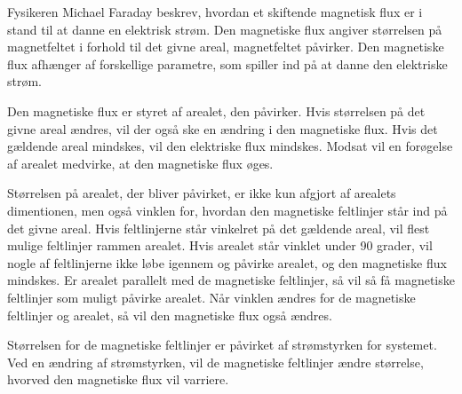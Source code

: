 Fysikeren Michael Faraday beskrev, hvordan et skiftende magnetisk flux er i stand til at danne en elektrisk strøm. Den magnetiske flux angiver størrelsen på magnetfeltet i forhold til det givne areal, magnetfeltet påvirker. Den magnetiske flux afhænger af forskellige parametre, som spiller ind på at danne den elektriske strøm.

Den magnetiske flux er styret af arealet, den påvirker. Hvis størrelsen på det givne areal ændres, vil der også ske en ændring i den magnetiske flux. Hvis det gældende areal mindskes, vil den elektriske flux mindskes. Modsat vil en forøgelse af arealet medvirke, at den magnetiske flux øges.


Størrelsen på arealet, der bliver påvirket, er ikke kun afgjort af arealets dimentionen, men også vinklen for, hvordan den magnetiske feltlinjer står ind på det givne areal. Hvis feltlinjerne står vinkelret på det gældende areal, vil flest mulige feltlinjer rammen arealet. Hvis arealet står vinklet under 90 grader, vil nogle af feltlinjerne ikke løbe igennem og påvirke arealet, og den magnetiske flux mindskes. Er arealet parallelt med de magnetiske feltlinjer, så vil så få magnetiske feltlinjer som muligt påvirke arealet. Når vinklen ændres for de magnetiske feltlinjer og arealet, så vil den magnetiske flux også ændres.


Størrelsen for de magnetiske feltlinjer er påvirket af strømstyrken for systemet. Ved en ændring af strømstyrken, vil de magnetiske feltlinjer ændre størrelse, hvorved den magnetiske flux vil varriere.